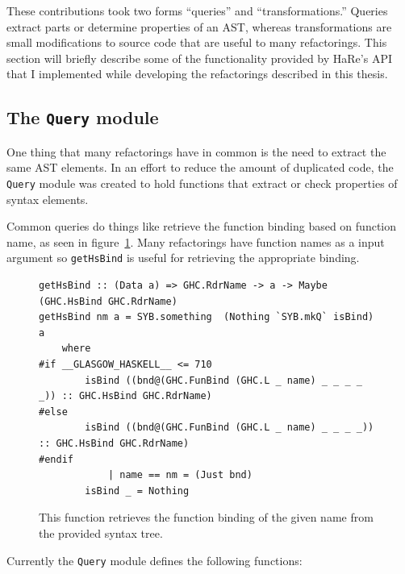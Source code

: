 These contributions took two forms ``queries'' and ``transformations.'' Queries extract parts or determine properties of an AST, whereas transformations are small modifications to source code that are useful to many refactorings. This section will briefly describe some of the functionality provided by HaRe's API that I implemented while developing the refactorings described in this thesis. 

\subsection{The \texttt{Query} module}

One thing that many refactorings have in common is the need to extract the same AST elements. In an effort to reduce the amount of duplicated code, the \texttt{Query} module was created to hold functions that extract or check properties of syntax elements.

Common queries do things like retrieve the function binding based on function name, as seen in figure~\ref{getHsBind}. Many refactorings have function names as a input argument so \texttt{getHsBind} is useful for retrieving the appropriate binding.

\begin{figure}[t]
\begin{lstlisting}
getHsBind :: (Data a) => GHC.RdrName -> a -> Maybe (GHC.HsBind GHC.RdrName)
getHsBind nm a = SYB.something  (Nothing `SYB.mkQ` isBind) a
    where
#if __GLASGOW_HASKELL__ <= 710
        isBind ((bnd@(GHC.FunBind (GHC.L _ name) _ _ _ _ _)) :: GHC.HsBind GHC.RdrName)
#else
        isBind ((bnd@(GHC.FunBind (GHC.L _ name) _ _ _ _)) :: GHC.HsBind GHC.RdrName)
#endif
            | name == nm = (Just bnd)
        isBind _ = Nothing
\end{lstlisting}
\caption{This function retrieves the function binding of the given name from the provided syntax tree.}
\label{getHsBind}
\end{figure}

Currently the \texttt{Query} module defines the following functions:

